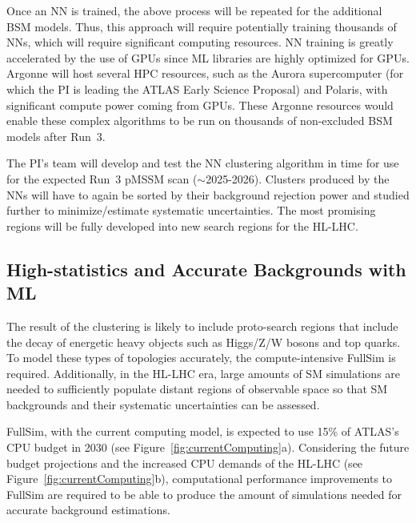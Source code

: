 \documentclass[letter, USenglish, 11pt, subfigure]{article}
\begin{document}
Once an NN is trained, the above process will be repeated for the additional BSM models. Thus, this approach will require potentially training thousands of NNs, which will require significant computing resources. NN training is greatly accelerated by the use of GPUs since ML libraries are highly optimized for GPUs. Argonne will host several HPC resources, such as the Aurora supercomputer (for which the PI is leading the ATLAS Early Science Proposal) and Polaris, with significant compute power coming from GPUs. These Argonne resources would enable these complex algorithms to be run on thousands of non-excluded BSM models after Run~3. %

The PI's team will develop and test the NN clustering algorithm in time for use for the expected Run~3 pMSSM scan ($\sim$2025-2026). Clusters produced by the NNs will have to again be sorted by their background rejection power and studied further to minimize/estimate systematic uncertainties. The most promising regions will be fully developed into new search regions for the HL-LHC.

\FloatBarrier
\subsection{High-statistics and Accurate Backgrounds with ML}
The result of the clustering is likely to include proto-search regions that include the decay of energetic heavy objects such as Higgs/Z/W bosons and top quarks. To model these types of topologies accurately, the compute-intensive FullSim is required. Additionally, in the HL-LHC era, large amounts of SM simulations are needed to sufficiently populate distant regions of observable space so that SM backgrounds and their systematic uncertainties can be assessed.

FullSim, with the current computing model, is expected to use 15\% of ATLAS's CPU budget in 2030 (see Figure~\ref{fig:currentComputing}a). Considering the future budget projections and the increased CPU demands of the HL-LHC (see Figure~\ref{fig:currentComputing}b), computational performance improvements to FullSim are required to be able to produce the amount of simulations needed for accurate background estimations.
\end{document}
